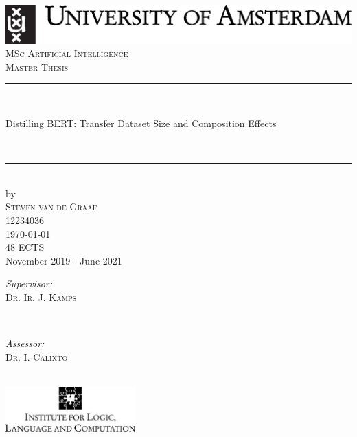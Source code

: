 \begin{titlepage}
\begin{fullwidth}
\newcommand{\HRule}{\rule{\linewidth}{0.5mm}}

\center %

\includegraphics[width=0.8\linewidth]{figures/00-title-page/uvalogo_regular_p_en.eps}\\[2.5cm]
\textsc{\Large MSc Artificial Intelligence}\\[0.2cm]
\textsc{\Large Master Thesis}\\[0.5cm] 

\HRule\\[0.4cm]
{ \huge \bfseries \strut{Distilling BERT: Transfer Dataset Size and Composition Effects}}\\[0.4cm]
\HRule\\[0.5cm]

by\\[0.2cm]

\textsc{\Large Steven van de Graaf}\\[0.2cm]
12234036\\[1cm]

{\Large \today}\\[1cm]
48 ECTS \\
November 2019 - June 2021 \\ [1cm]

\begin{minipage}[t]{0.4\textwidth}
    \begin{flushleft}
        \large
        \emph{Supervisor:} \\
        \textsc{Dr. Ir. J. Kamps}
    \end{flushleft}
\end{minipage}

~

\begin{minipage}[t]{0.4\textwidth}
    \begin{flushright}
        \large
        \emph{Assessor:} \\
        \textsc{Dr. I. Calixto}
    \end{flushright}
\end{minipage}\\[2cm]

\includegraphics[width=5cm]{figures/00-title-page/illclogo.jpg} \\

\vfill

\end{fullwidth}
\end{titlepage}